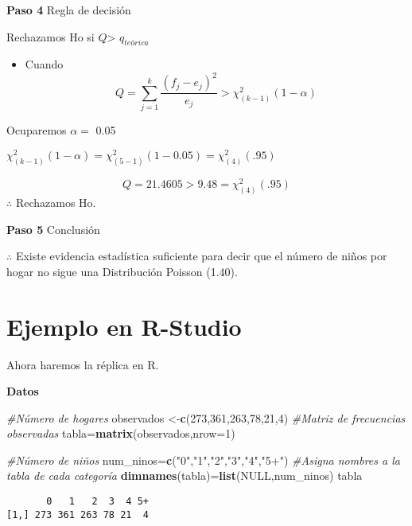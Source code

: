 \documentclass[a4paper,oneside,openany]{book}
\newenvironment{Shaded}{\begin{snugshade}}{\end{snugshade}}
\newcommand{\KeywordTok}[1]{\textcolor[rgb]{0.13,0.29,0.53}{\textbf{#1}}}
\newcommand{\DataTypeTok}[1]{\textcolor[rgb]{0.13,0.29,0.53}{#1}}
\newcommand{\DecValTok}[1]{\textcolor[rgb]{0.00,0.00,0.81}{#1}}
\newcommand{\StringTok}[1]{\textcolor[rgb]{0.31,0.60,0.02}{#1}}
\newcommand{\CommentTok}[1]{\textcolor[rgb]{0.56,0.35,0.01}{\textit{#1}}}
\newcommand{\OtherTok}[1]{\textcolor[rgb]{0.56,0.35,0.01}{#1}}
\newcommand{\NormalTok}[1]{#1}
\providecommand{\tightlist}{%
  \setlength{\itemsep}{0pt}\setlength{\parskip}{0pt}}
\begin{document}
\textbf{Paso 4} Regla de decisión

Rechazamos Ho si \(Q\)\textgreater{} \(q_{teórica}\)

\begin{itemize}
\tightlist
\item
  Cuando
  \[Q= \sum_{j=1}^{k}\frac{(f_{j}-e_{j})^2}{e_{j}} > \chi^2_{(k-1)}(1-\alpha)\]
\end{itemize}

Ocuparemos \(\alpha=\) 0.05

\(\chi^2_{(k-1)}(1-\alpha)=\chi^2_{(5-1)}(1-0.05) =\chi^2_{(4)}(.95)\)

\[ Q=21.4605 > 9.48= \chi^2_{(4)}(.95)\] \(\therefore\) Rechazamos Ho.

\textbf{Paso 5} Conclusión

\(\therefore\) Existe evidencia estadística suficiente para decir que el
número de niños por hogar no sigue una Distribución Poisson (1.40).

\section{Ejemplo en R-Studio}\label{ejemplo-en-r-studio-13}

Ahora haremos la réplica en R.

\textbf{Datos}

\begin{Shaded}
\begin{Highlighting}[]
\CommentTok{#Número de hogares}
\NormalTok{observados <-}\KeywordTok{c}\NormalTok{(}\DecValTok{273}\NormalTok{,}\DecValTok{361}\NormalTok{,}\DecValTok{263}\NormalTok{,}\DecValTok{78}\NormalTok{,}\DecValTok{21}\NormalTok{,}\DecValTok{4}\NormalTok{) }
\CommentTok{#Matriz de frecuencias observadas}
\NormalTok{tabla=}\KeywordTok{matrix}\NormalTok{(observados,}\DataTypeTok{nrow=}\DecValTok{1}\NormalTok{)}

\CommentTok{#Número de niños}
\NormalTok{num_ninos=}\KeywordTok{c}\NormalTok{(}\StringTok{"0"}\NormalTok{,}\StringTok{"1"}\NormalTok{,}\StringTok{"2"}\NormalTok{,}\StringTok{"3"}\NormalTok{,}\StringTok{"4"}\NormalTok{,}\StringTok{"5+"}\NormalTok{)}
\CommentTok{#Asigna nombres a la tabla de cada categoría}
\KeywordTok{dimnames}\NormalTok{(tabla)=}\KeywordTok{list}\NormalTok{(}\OtherTok{NULL}\NormalTok{,num_ninos)}
\NormalTok{tabla}
\end{Highlighting}
\end{Shaded}

\begin{verbatim}
       0   1   2  3  4 5+
[1,] 273 361 263 78 21  4
\end{verbatim}
\end{document}
